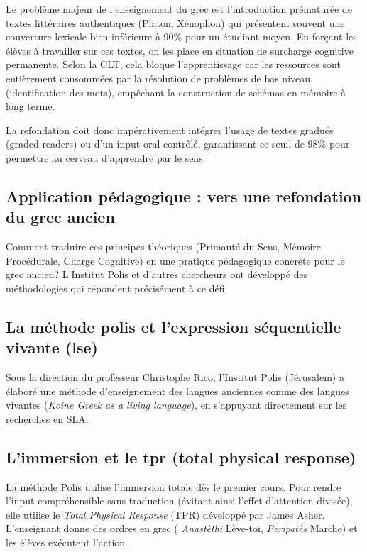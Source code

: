Le problème majeur de l'enseignement du grec est l'introduction prématurée de textes littéraires \og
authentiques\fg{} (Platon, Xénophon) qui présentent souvent une couverture lexicale bien inférieure
à 90\% pour un étudiant moyen. En forçant les élèves à travailler sur ces textes, on les place en
situation de surcharge cognitive permanente. Selon la CLT, cela bloque l'apprentissage car les
ressources sont entièrement consommées par la résolution de problèmes de bas niveau (identification
des mots), empêchant la construction de schémas en mémoire à long terme.\cite{II-3-3-ref49}

La refondation doit donc impérativement intégrer l'usage de textes gradués (graded readers) ou d'un
input oral contrôlé, garantissant ce seuil de 98\% pour permettre au cerveau d'apprendre par le
sens.



\subsection{Application pédagogique : vers une refondation du grec ancien}

Comment traduire ces principes théoriques (Primauté du Sens, Mémoire Procédurale, Charge Cognitive)
en une pratique pédagogique concrète pour le grec ancien? L'Institut Polis et d'autres chercheurs
ont développé des méthodologies qui répondent précisément à ce défi.



\subsection{La méthode polis et l'expression séquentielle vivante (lse)}

Sous la direction du professeur Christophe Rico, l'Institut Polis (Jérusalem) a élaboré une méthode
d'enseignement des langues anciennes comme des langues vivantes (\textit{Koine Greek as a living
language}), en s'appuyant directement sur les recherches en SLA.



\subsection{L'immersion et le tpr (total physical response)}

La méthode Polis utilise l'immersion totale dès le premier cours. Pour rendre l'input compréhensible
sans traduction (évitant ainsi l'effet d'attention divisée), elle utilise le \textit{Total Physical
Response} (TPR) développé par James Asher. L'enseignant donne des ordres en grec (\textit{\og
Anastèthi\fg{}} \- Lève-toi, \textit{\og Peripatès\fg{}} \- Marche) et les élèves exécutent
l'action.\cite{II-3-3-ref50}

